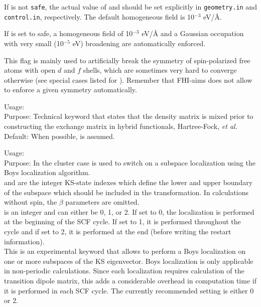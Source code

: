 If  is not \texttt{safe}, the actual value of
 and  should be
set explicitly in \texttt{geometry.in} and \texttt{control.in},
respectively. The default homogeneous field is 10$^{-3}$ eV/{\AA}.

If  is set to safe, a homogeneous field of 10$^{-3}$
eV/{\AA} and a Gaussian occupation with very small (10$^{-5}$ eV)
broadening are automatically enforced.

This flag is mainly used to artificially break the symmetry of
spin-polarized free atoms with open $d$ and $f$ shells, which are
sometimes very hard to converge otherwise (see special cases listed
for ). Remember that FHI-aims does not allow to enforce
a given symmetry automatically.


{
  \noindent
  Usage:  \\[1.0ex]
  Purpose: Technical keyword that states that the density matrix is
    mixed prior to constructing the exchange matrix in hybrid
    functionals, Hartree-Fock, \emph{et al.} \\[1.0ex]
  Default: When possible,  is
    assumed.
}


{
  \noindent
  Usage:  
      \\[1.0ex]
  Purpose: In the cluster case is used to switch on a subspace localization
  using the Boys localization algorithm. \\[1.0ex]
   and  are the integer
  KS-state indexes which define the lower and upper boundary of the subspace which should
  be included in the transformation. In calculations without spin, the $\beta$
  parameters are omitted.\\
   is an integer and can either be 0, 1, or 2. If set to
  0, the localization is performed at the beginning of the SCF cycle. If set to
  1, it is performed throughout the cycle and if set to 2, it is performed at
  the end (before writing the restart information).\\
}
This is an experimental keyword that allows to perform a Boys localization on
one or more subspaces of the KS eigenvector. Boys localization is only
applicable in non-periodic calculations. Since each localization requires
calculation of the transition dipole matrix, this adds a considerable overhead
in computation time if it is performed in each SCF cycle. The currently
recommended setting is either 0 or 2.


